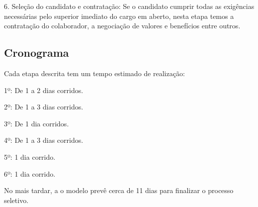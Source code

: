 6. Seleção do candidato e contratação:
Se o candidato cumprir todas as exigências necessárias pelo superior imediato do cargo em aberto, nesta etapa temos a contratação do colaborador, a negociação de valores e benefícios entre outros.

\subsection{Cronograma}
Cada etapa descrita tem um tempo estimado de realização:

1º: De 1 a 2 dias corridos.

2º: De 1 a 3 dias corridos.

3º: De 1 dia corridos.

4º: De 1 a 3 dias corridos.

5º: 1 dia corrido.

6º: 1 dia corrido.

No mais tardar, a o modelo prevê cerca de 11 dias para finalizar o processo seletivo.
